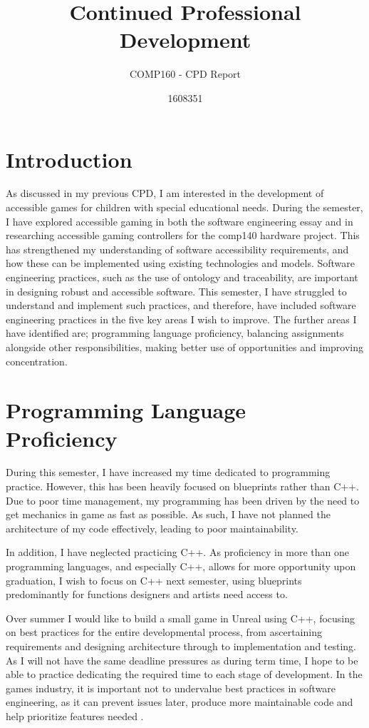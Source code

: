 \documentclass{scrartcl}
\title{Continued Professional Development}
\subtitle{COMP160 - CPD Report}
\author{1608351}
\begin{document}
\maketitle

\section{Introduction}

As discussed in my previous CPD, I am interested in the development of accessible games for children with special educational needs. During the semester, I have explored accessible gaming in both the software engineering essay and in researching accessible gaming controllers for the comp140 hardware project. This has strengthened my understanding of software accessibility requirements, and how these can be implemented using existing technologies and models. Software engineering practices, such as the use of ontology and traceability, are important in designing robust and accessible software. This semester, I have struggled to understand and implement such practices, and therefore, have included software engineering practices in the five key areas I wish to improve. The further areas I have identified are; programming language proficiency, balancing assignments alongside other responsibilities, making better use of opportunities and improving concentration. 

\section{Programming Language Proficiency}

During this semester, I have increased my time dedicated to programming practice. However, this has been heavily focused on blueprints rather than C++. Due to poor time management, my programming has been driven by the need to get mechanics in game as fast as possible. As such, I have not planned the architecture of my code effectively, leading to poor maintainability.

In addition, I have neglected practicing C++. As proficiency in more than one programming languages, and especially C++, allows for more opportunity upon graduation, I wish to focus on C++ next semester, using blueprints predominantly for functions designers and artists need access to.

Over summer I would like to build a small game in Unreal using C++, focusing on best practices for the entire developmental process, from ascertaining requirements and designing architecture through to implementation and testing. As I will not have the same deadline pressures as during term time, I hope to be able to practice dedicating the required time to each stage of development. In the games industry, it is important not to undervalue best practices in software engineering, as it can prevent issues later, produce more maintainable code and help prioritize features needed \cite{1}.
\end{document}
